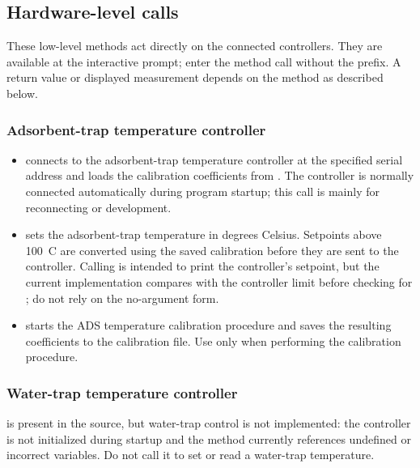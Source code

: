 \subsection{Hardware-level calls}

These low-level methods act directly on the connected controllers. They are
available at the interactive prompt; enter the method call without the
 prefix. A return value or displayed measurement depends on the
method as described below.

\subsubsection{Adsorbent-trap temperature controller}

\begin{itemize}
    \item {} connects to the adsorbent-trap
    temperature controller at the specified serial address and loads the
    calibration coefficients from
    . The controller is
    normally connected automatically during program startup; this call is
    mainly for reconnecting or development.
    \item {} sets the adsorbent-trap temperature in
    degrees Celsius. Setpoints above 100~\textdegree C are converted using
    the saved calibration before they are sent to the controller. Calling
     is intended to print the controller's setpoint, but
    the current implementation compares  with the controller
    limit before checking for ; do not rely on the no-argument
    form.
    \item {} starts the ADS temperature
    calibration procedure and saves the resulting coefficients to the
    calibration file. Use only when performing the calibration procedure.
\end{itemize}

\subsubsection{Water-trap temperature controller}

 is present in the source, but water-trap control
is not implemented: the controller is not initialized during startup and the
method currently references undefined or incorrect variables. Do not call it
to set or read a water-trap temperature.


